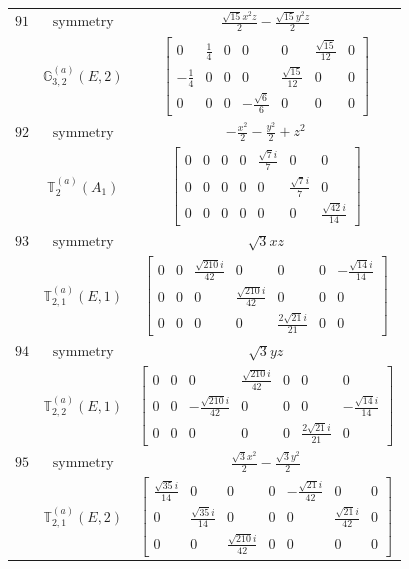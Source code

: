 \documentclass[fleqn,8pt,landscape]{jsarticle}
\begin{document}
\begin{longtable}{ccc}
$ 91 $ & $ \text{symmetry} $ & $ \frac{\sqrt{15} x^{2} z}{2} - \frac{\sqrt{15} y^{2} z}{2} $ \\
$  $ & $ \mathbb{G}_{3,2}^{(a)}(E,2) $ & $ \begin{bmatrix} 0 & \frac{1}{4} & 0 & 0 & 0 & \frac{\sqrt{15}}{12} & 0 \\ - \frac{1}{4} & 0 & 0 & 0 & \frac{\sqrt{15}}{12} & 0 & 0 \\ 0 & 0 & 0 & - \frac{\sqrt{6}}{6} & 0 & 0 & 0 \end{bmatrix} $ \\ \hline
$ 92 $ & $ \text{symmetry} $ & $ - \frac{x^{2}}{2} - \frac{y^{2}}{2} + z^{2} $ \\
$  $ & $ \mathbb{T}_{2}^{(a)}(A_{1}) $ & $ \begin{bmatrix} 0 & 0 & 0 & 0 & \frac{\sqrt{7} i}{7} & 0 & 0 \\ 0 & 0 & 0 & 0 & 0 & \frac{\sqrt{7} i}{7} & 0 \\ 0 & 0 & 0 & 0 & 0 & 0 & \frac{\sqrt{42} i}{14} \end{bmatrix} $ \\ \hline
$ 93 $ & $ \text{symmetry} $ & $ \sqrt{3} x z $ \\
$  $ & $ \mathbb{T}_{2,1}^{(a)}(E,1) $ & $ \begin{bmatrix} 0 & 0 & \frac{\sqrt{210} i}{42} & 0 & 0 & 0 & - \frac{\sqrt{14} i}{14} \\ 0 & 0 & 0 & \frac{\sqrt{210} i}{42} & 0 & 0 & 0 \\ 0 & 0 & 0 & 0 & \frac{2 \sqrt{21} i}{21} & 0 & 0 \end{bmatrix} $ \\ \hline
$ 94 $ & $ \text{symmetry} $ & $ \sqrt{3} y z $ \\
$  $ & $ \mathbb{T}_{2,2}^{(a)}(E,1) $ & $ \begin{bmatrix} 0 & 0 & 0 & \frac{\sqrt{210} i}{42} & 0 & 0 & 0 \\ 0 & 0 & - \frac{\sqrt{210} i}{42} & 0 & 0 & 0 & - \frac{\sqrt{14} i}{14} \\ 0 & 0 & 0 & 0 & 0 & \frac{2 \sqrt{21} i}{21} & 0 \end{bmatrix} $ \\ \hline
$ 95 $ & $ \text{symmetry} $ & $ \frac{\sqrt{3} x^{2}}{2} - \frac{\sqrt{3} y^{2}}{2} $ \\
$  $ & $ \mathbb{T}_{2,1}^{(a)}(E,2) $ & $ \begin{bmatrix} \frac{\sqrt{35} i}{14} & 0 & 0 & 0 & - \frac{\sqrt{21} i}{42} & 0 & 0 \\ 0 & \frac{\sqrt{35} i}{14} & 0 & 0 & 0 & \frac{\sqrt{21} i}{42} & 0 \\ 0 & 0 & \frac{\sqrt{210} i}{42} & 0 & 0 & 0 & 0 \end{bmatrix} $ \\ \hline

\end{longtable}
\end{document}
